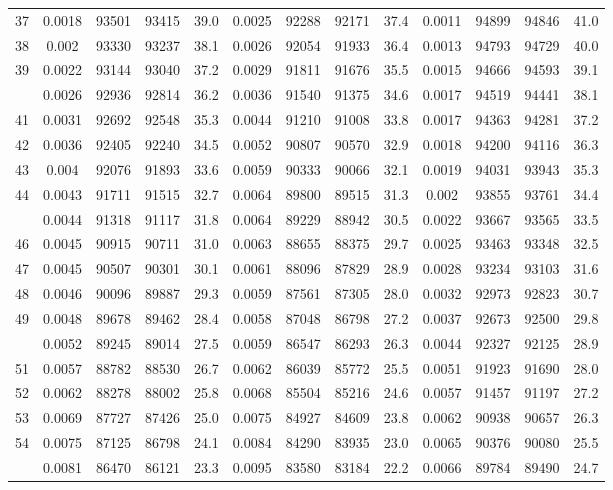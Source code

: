 \documentclass[
  14pt,
]{article}
\begin{document}
\begin{longtable}[t]{lcccccccccccc}
37 & 0.0018 & 93501 & 93415 & 39.0 & 0.0025 & 92288 & 92171 & 37.4 & 0.0011 & 94899 & 94846 & 41.0\\
38 & 0.002 & 93330 & 93237 & 38.1 & 0.0026 & 92054 & 91933 & 36.4 & 0.0013 & 94793 & 94729 & 40.0\\
39 & 0.0022 & 93144 & 93040 & 37.2 & 0.0029 & 91811 & 91676 & 35.5 & 0.0015 & 94666 & 94593 & 39.1\\
\addlinespace
40 & 0.0026 & 92936 & 92814 & 36.2 & 0.0036 & 91540 & 91375 & 34.6 & 0.0017 & 94519 & 94441 & 38.1\\
41 & 0.0031 & 92692 & 92548 & 35.3 & 0.0044 & 91210 & 91008 & 33.8 & 0.0017 & 94363 & 94281 & 37.2\\
42 & 0.0036 & 92405 & 92240 & 34.5 & 0.0052 & 90807 & 90570 & 32.9 & 0.0018 & 94200 & 94116 & 36.3\\
43 & 0.004 & 92076 & 91893 & 33.6 & 0.0059 & 90333 & 90066 & 32.1 & 0.0019 & 94031 & 93943 & 35.3\\
44 & 0.0043 & 91711 & 91515 & 32.7 & 0.0064 & 89800 & 89515 & 31.3 & 0.002 & 93855 & 93761 & 34.4\\
\addlinespace
45 & 0.0044 & 91318 & 91117 & 31.8 & 0.0064 & 89229 & 88942 & 30.5 & 0.0022 & 93667 & 93565 & 33.5\\
46 & 0.0045 & 90915 & 90711 & 31.0 & 0.0063 & 88655 & 88375 & 29.7 & 0.0025 & 93463 & 93348 & 32.5\\
47 & 0.0045 & 90507 & 90301 & 30.1 & 0.0061 & 88096 & 87829 & 28.9 & 0.0028 & 93234 & 93103 & 31.6\\
48 & 0.0046 & 90096 & 89887 & 29.3 & 0.0059 & 87561 & 87305 & 28.0 & 0.0032 & 92973 & 92823 & 30.7\\
49 & 0.0048 & 89678 & 89462 & 28.4 & 0.0058 & 87048 & 86798 & 27.2 & 0.0037 & 92673 & 92500 & 29.8\\
\addlinespace
50 & 0.0052 & 89245 & 89014 & 27.5 & 0.0059 & 86547 & 86293 & 26.3 & 0.0044 & 92327 & 92125 & 28.9\\
51 & 0.0057 & 88782 & 88530 & 26.7 & 0.0062 & 86039 & 85772 & 25.5 & 0.0051 & 91923 & 91690 & 28.0\\
52 & 0.0062 & 88278 & 88002 & 25.8 & 0.0068 & 85504 & 85216 & 24.6 & 0.0057 & 91457 & 91197 & 27.2\\
53 & 0.0069 & 87727 & 87426 & 25.0 & 0.0075 & 84927 & 84609 & 23.8 & 0.0062 & 90938 & 90657 & 26.3\\
54 & 0.0075 & 87125 & 86798 & 24.1 & 0.0084 & 84290 & 83935 & 23.0 & 0.0065 & 90376 & 90080 & 25.5\\
\addlinespace
55 & 0.0081 & 86470 & 86121 & 23.3 & 0.0095 & 83580 & 83184 & 22.2 & 0.0066 & 89784 & 89490 & 24.7\\

\end{longtable}
\end{document}

